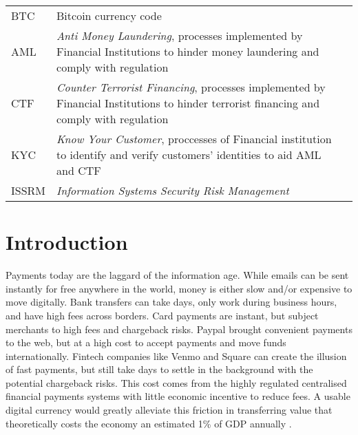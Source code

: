 \documentclass[12pt]{article} %
\begin{document}
\begin{tabular}{p{3 cm}ll} %
BTC & Bitcoin currency code\\
AML & \textit{Anti Money Laundering}, processes implemented by Financial Institutions to hinder money laundering and comply with regulation\\
CTF & \textit{Counter Terrorist Financing}, processes implemented by Financial Institutions to hinder terrorist financing and comply with regulation\\
KYC & \textit{Know Your Customer}, proccesses of Financial institution to identify and verify customers' identities to aid AML and CTF\\
ISSRM & \textit{Information Systems Security Risk Management} \\
\end{tabular}


\pagebreak

\tableofcontents
\newpage

\listoffigures
\pagebreak

\listoftables
\pagebreak

\section{Introduction} \label{sec:1}

Payments today are the laggard of the information age. While emails can be sent instantly for free anywhere in the world, money is either slow and/or expensive to move digitally. Bank transfers can take days, only work during business hours, and have high fees across borders. Card payments are instant, but subject merchants to high fees and chargeback risks. Paypal brought convenient payments to the web, but at a high cost to accept payments and move funds internationally. Fintech companies like Venmo and Square can create the illusion of fast payments, but still take days to settle in the background with the potential chargeback risks. This cost comes from the highly regulated centralised financial payments systems with little economic incentive to reduce fees. A usable digital currency would greatly alleviate this friction in transferring value that theoretically costs the economy an estimated 1\% of GDP annually \cite{kaarmann2013cost}.
\end{document}
